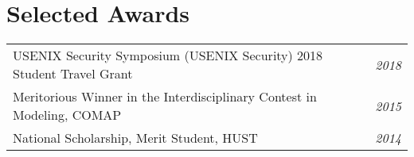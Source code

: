 \documentclass[a4paper,10pt]{article}
\begin{document}
\vspace{-0.6cm}

\section{Selected Awards}

\vspace{-0.3cm}

\begin{tabular}{p{15cm}p{2.5cm}}
USENIX Security Symposium (USENIX Security) 2018 Student Travel Grant & \emph{2018} \\
Meritorious Winner in the Interdisciplinary Contest in Modeling, COMAP \hspace{5em} & \emph{2015} \\
National Scholarship, Merit Student, HUST & \emph{2014} \\
\end{tabular}

\vspace{-0.3cm}








\end{document}
